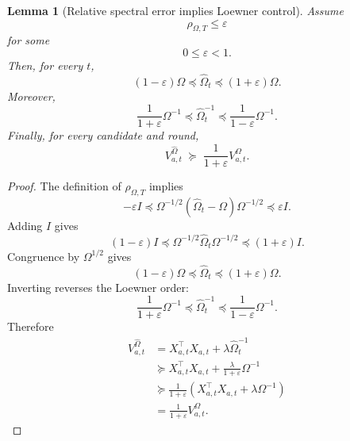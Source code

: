 \documentclass{article} %
\newtheorem{lemma}[theorem]{Lemma}
\begin{document}
\begin{lemma}[Relative spectral error implies Loewner control]
\label{lem:hyper-perturb-loewner}
Assume
\begin{equation}
\label{eq:hyper-perturb-eps}
\rho_{\Omega,T}\le \varepsilon
\end{equation}
for some
\begin{equation}
\label{eq:hyper-perturb-eps-range}
0\le \varepsilon <1 .
\end{equation}
Then, for every \(t\),
\begin{equation}
\label{eq:hyper-perturb-omega-loewner}
(1-\varepsilon)\Omega
\preceq
\widehat{\Omega}_t
\preceq
(1+\varepsilon)\Omega .
\end{equation}
Moreover,
\begin{equation}
\label{eq:hyper-perturb-inv-loewner}
\frac{1}{1+\varepsilon}\Omega^{-1}
\preceq
\widehat{\Omega}_t^{-1}
\preceq
\frac{1}{1-\varepsilon}\Omega^{-1}.
\end{equation}
Finally, for every candidate and round,
\begin{equation}
\label{eq:hyper-perturb-V-lower}
V_{a,t}^{\widehat{\Omega}}
\;\succeq\;
\frac{1}{1+\varepsilon}
V_{a,t}^{\Omega}.
\end{equation}
\end{lemma}

\begin{proof}
The definition of \(\rho_{\Omega,T}\) implies
\begin{equation}
\label{eq:hyper-perturb-proof-relative}
-\varepsilon I
\preceq
\Omega^{-1/2}
\left(
\widehat{\Omega}_t-\Omega
\right)
\Omega^{-1/2}
\preceq
\varepsilon I .
\end{equation}
Adding \(I\) gives
\begin{equation}
\label{eq:hyper-perturb-proof-addI}
(1-\varepsilon)I
\preceq
\Omega^{-1/2}\widehat{\Omega}_t\Omega^{-1/2}
\preceq
(1+\varepsilon)I .
\end{equation}
Congruence by \(\Omega^{1/2}\) gives
\begin{equation}
\label{eq:hyper-perturb-proof-omega}
(1-\varepsilon)\Omega
\preceq
\widehat{\Omega}_t
\preceq
(1+\varepsilon)\Omega .
\end{equation}
Inverting reverses the Loewner order:
\begin{equation}
\label{eq:hyper-perturb-proof-inv}
\frac{1}{1+\varepsilon}\Omega^{-1}
\preceq
\widehat{\Omega}_t^{-1}
\preceq
\frac{1}{1-\varepsilon}\Omega^{-1}.
\end{equation}
Therefore
\begin{align}
\label{eq:hyper-perturb-proof-V}
V_{a,t}^{\widehat{\Omega}}
&=
X_{a,t}^{\top}X_{a,t}
+
\lambda\widehat{\Omega}_t^{-1}
\\
&\succeq
X_{a,t}^{\top}X_{a,t}
+
\frac{\lambda}{1+\varepsilon}\Omega^{-1}
\\
&\succeq
\frac{1}{1+\varepsilon}
\left(
X_{a,t}^{\top}X_{a,t}
+
\lambda\Omega^{-1}
\right)
\\
&=
\frac{1}{1+\varepsilon}
V_{a,t}^{\Omega}.
\end{align}
\end{proof}
\end{document}
